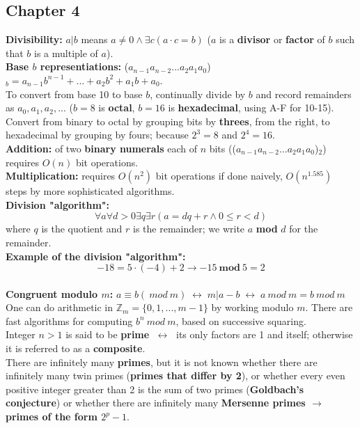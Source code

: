 \documentclass[12pt]{article}
\newcommand{\Z}{\mathbb{Z}}
\renewcommand{\iff}{\;\leftrightarrow\;}
\begin{document}
\subsection{Chapter 4}
\textbf{Divisibility:} $a | b$ means $a \neq 0 \wedge \exists c(a\cdot c=b)$ ($a$ is a \textbf{divisor} or \textbf{factor} of $b$ such that $b$ is a multiple of $a$). \\
\textbf{Base $b$ representiations:} ($a_{n-1}a_{n-2}...a_2a_1a_0$)$_b = a_{n-1}b^{n-1}+...+a_2b^2+a_1b+a_0$.\\
To convert from base 10 to base $b$, continually divide by $b$ and record remainders as $a_0,a_1,a_2,...$ ($b=8$ is \textbf{octal}, $b=16$ is \textbf{hexadecimal}, using A-F for 10-15). Convert from binary to octal by grouping bits by \textbf{threes}, from the right, to hexadecimal by grouping by fours; because $2^3=8$ and $2^4=16$. \\
\textbf{Addition:} of two \textbf{binary numerals} each of $n$ bits (($a_{n-1}a_{n-2}...a_2a_1a_0$)$_2$) requires $O(n)$ bit operations.\\
\textbf{Multiplication:} requires $O(n^2)$ bit operations if done naively, $O(n^{1.585})$ steps by more sophisticated algorithms. \\
\textbf{Division "algorithm":}
$$
\forall a \forall d > 0 \exists q \exists r (a = dq + r \wedge 0 \leq r < d)
$$
where $q$ is the quotient and $r$ is the remainder; we write $a$ \textbf{mod} $d$ for the remainder. \\
\textbf{Example of the division "algorithm":}
$$
-18 = 5 \cdot (-4) + 2 \rightarrow -15\ \textbf{mod}\ 5 = 2
$$\\
\textbf{Congruent modulo $m$:} $a \equiv b (\ mod\  m) \iff m | a - b \iff a\ mod\ m = b\ mod\ m$ \\
One can do arithmetic in $\Z_m = \{ 0,1,...,m-1\}$ by working modulo $m$. There are fast algorithms for computing $b^n\ mod\ m$, based on successive squaring. \\
Integer $n > 1$ is said to be \textbf{prime} $\iff$ its only factors are 1 and itself; otherwise it is referred to as a \textbf{composite}. \\
There are infinitely many \textbf{primes}, but it is not known whether there are infinitely many twin primes (\textbf{primes that differ by 2}), or whether every even positive integer greater than 2 is the sum of two primes (\textbf{Goldbach's conjecture}) or whether there are infinitely many \textbf{Mersenne primes $\rightarrow$ primes of the form $2^p -1$}. \\
\end{document}
